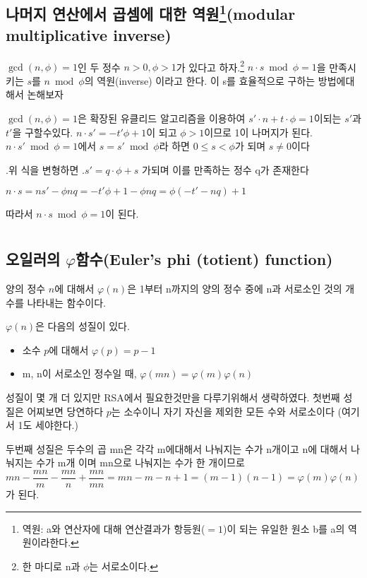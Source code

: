 \documentclass{oblivoir}
\begin{document}
\section{나머지 연산에서 곱셈에 대한 역원\footnote{역원: a와 연산자에 대해 연산결과가 항등원($=1$)이 되는 유일한 원소 b를 a의 역원이라한다.}(modular multiplicative inverse)}
$\gcd(n,\phi)=1$인 두 정수 $n>0, \phi>1$가 있다고 하자.\footnote{한 마디로 n과 $\phi$는 서로소이다.}
$n\cdot s\bmod  \phi =1 $을 만족시키는 $s$를 $n\bmod  \phi$의 역원(inverse) 이라고 한다.\newline
이 s를 효율적으로 구하는 방법에대해서 논해보자\par
$\gcd(n,\phi)=1$은 확장된 유클리드 알고리즘을 이용하여 $s'\cdot n + t \cdot \phi = 1$이되는 $s'$과 $t'$을 구할수있다. $n\cdot s'= -t'\phi+1$이 되고 $\phi>1$이므로 1이 나머지가 된다.
$n\cdot s'\bmod  \phi =1$에서 $s= s'\bmod  \phi$라 하면 $0 \le s <\phi$가 되며 $s  \ne 0$이다\par.위 식을 변형하면 .$s'=q\cdot \phi +s$ 가되며 이를 만족하는 정수 q가 존재한다  
\begin{center}
    $n\cdot s=ns'-\phi nq=-t'\phi +1 -\phi nq=\phi(-t'-nq)+1 $
\end{center}
따라서 $n\cdot s\bmod  \phi =1 $이 된다.
\newpage
\chapter{}
\section{오일러의 $\varphi$함수(Euler’s phi (totient) function)}
양의 정수 $n$에 대해서 $\varphi (n)$은 1부터 n까지의 양의 정수 중에 n과 서로소인 것의 개수를 나타내는 함수이다.\par\par

$\varphi (n)$은 다음의 성질이 있다.
\begin{itemize}
\item{소수 $p$에 대해서  $\varphi (p)=p-1$}
\item{ m, n이 서로소인 정수일 때,   $\varphi (mn)=\varphi (m)\varphi (n)$ }
\end{itemize}

성질이 몇 개 더 있지만 RSA에서 필요한것만을 다루기위해서 생략하였다.
첫번째 성질은 어찌보면 당연하다 $p$는 소수이니 자기 자신을 제외한 모든 수와 서로소이다 (여기서 1도 세야한다.)\par
두번째 성질은 두수의 곱 mn은 각각 m에대해서 나눠지는 수가 n개이고 n에 대해서 나눠지는 수가 m개 이며 mn으로 나눠지는 수가 한 개이므로 
$mn -\dfrac{mn}{m}-\dfrac{mn}{n}+\dfrac{mn}{mn} =mn -m -n +1=(m-1)(n-1)=\varphi (m)\varphi(n)$가 된다.
\end{document}
